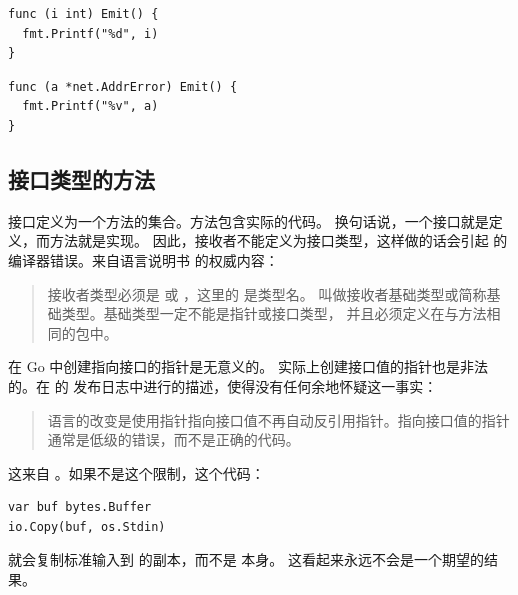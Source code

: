 \begin{minipage}{.5\textwidth}
\begin{lstlisting}[linewidth=.7\textwidth,caption=扩展内建类型错误]
func (i int) Emit() {
  fmt.Printf("%d", i)
}
\end{lstlisting}
\noindent{}
\end{minipage}
\begin{minipage}{.5\textwidth}
\begin{lstlisting}[caption=扩展非本地类型错误]
func (a *net.AddrError) Emit() {
  fmt.Printf("%v", a)
}
\end{lstlisting}
\noindent{}
\end{minipage}

\paragraph{}  %

\subsection{接口类型的方法}
接口定义为一个方法的集合。方法包含实际的代码。
换句话说，一个接口就是定义，而方法就是实现。
因此，接收者不能定义为接口类型，这样做的话会引起
 的编译器错误。来自语言说明书 \cite{go_spec} 的权威内容：
\begin{quote}
接收者类型必须是  或 ，这里的  是类型名。
 叫做接收者基础类型或简称基础类型。基础类型一定不能是指针或接口类型，
并且必须定义在与方法相同的包中。
\end{quote}

\begin{lbar}
在 Go 中创建指向接口的指针是无意义的。
实际上创建接口值的指针也是非法的。在  的
发布日志中进行的描述，使得没有任何余地怀疑这一事实：
\begin{quote}
语言的改变是使用指针指向接口值不再自动反引用指针。指向接口值的指针通常是低级的错误，而不是正确的代码。
\end{quote}
这来自 \cite{go_faq}。如果不是这个限制，这个代码：
\begin{lstlisting}
var buf bytes.Buffer
io.Copy(buf, os.Stdin)
\end{lstlisting}
就会复制标准输入到  的副本，而不是  本身。
这看起来永远不会是一个期望的结果。
\end{lbar}

